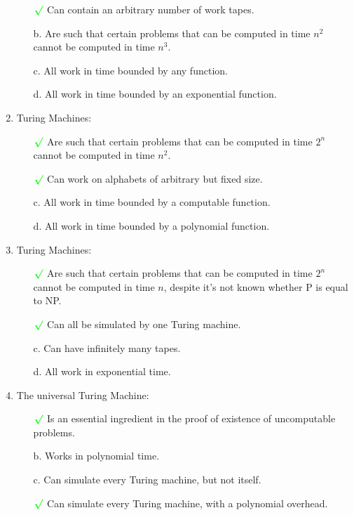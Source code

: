 \documentclass{article}
\begin{document}
\begin{enumerate}[label=\textbf{\arabic*.}, leftmargin=*]
\begin{enumerate}[label=\alph*.]
					\item[$\color{green}\boldsymbol{\surd}$] Can contain an arbitrary number of work tapes.
					\item[b.] Are such that certain problems that can be computed in time $n^2$ cannot be computed in time $n^3$.
					\item[c.] All work in time bounded by any function.
					\item[d.] All work in time bounded by an exponential function.
				\end{enumerate}
				\item Turing Machines:
				\begin{enumerate}[label=\alph*.]
					\item[$\color{green}\boldsymbol{\surd}$] Are such that certain problems that can be computed in time $2^n$ cannot be computed in time $n^2$.
					\item[$\color{green}\boldsymbol{\surd}$] Can work on alphabets of arbitrary but fixed size.
					\item[c.] All work in time bounded by a computable function.
					\item[d.] All work in time bounded by a polynomial function.
				\end{enumerate}
				\item Turing Machines:
				\begin{enumerate}[label=\alph*.]
					\item[$\color{green}\boldsymbol{\surd}$] Are such that certain problems that can be computed in time $2^n$ cannot be computed in time $n$, despite it's not known whether P is equal to NP.
					\item[$\color{green}\boldsymbol{\surd}$] Can all be simulated by one Turing machine.
					\item[c.] Can have infinitely many tapes.
					\item[d.] All work in exponential time.
				\end{enumerate}
				\item The universal Turing Machine:
				\begin{enumerate}[label=\alph*.]
					\item[$\color{green}\boldsymbol{\surd}$] Is an essential ingredient in the proof of existence of uncomputable problems.
					\item[b.] Works in polynomial time.
					\item[c.] Can simulate every Turing machine, but not itself.
					\item[$\color{green}\boldsymbol{\surd}$] Can simulate every Turing machine, with a polynomial overhead.
				\end{enumerate}
			\end{enumerate}
		\newpage
\end{document}
